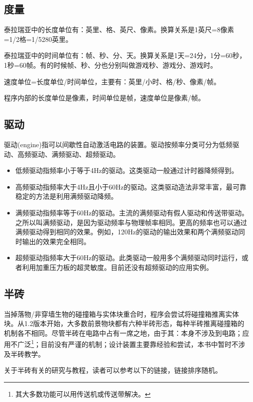 \subsection{度量}
泰拉瑞亚中的长度单位有：英里、格、英尺、像素。换算关系是1英尺=8像素=1/2格=1/5280英里。

泰拉瑞亚中的时间单位有：帧、秒、分、天。换算关系是1天=24分，1分=60秒，1秒=60帧。有的时候帧、秒、分也分别叫做游戏秒、游戏分、游戏时。

速度单位=长度单位/时间单位，主要有：英里/小时、格/秒、像素/帧。

程序内部的长度单位是像素，时间单位是帧，速度单位是像素/帧。

\subsection{驱动}

驱动(engine)指可以间歇性自动激活电路的装置。驱动按频率分类可分为低频驱动、高频驱动、满频驱动、超频驱动。

\begin{itemize}
\item 低频驱动指频率小于等于4Hz的驱动。这类驱动一般通过计时器降频得到。
\item 高频驱动指频率大于4Hz且小于60Hz的驱动。这类驱动造法非常丰富，最可靠稳定的方法是利用满频驱动降频。
\item 满频驱动指频率等于60Hz的驱动。主流的满频驱动有假人驱动和传送带驱动。之所以叫满频驱动，是因为驱动频率与物理帧率相同。更高的频率也可以通过满频驱动得到相同的效果。例如，120Hz的驱动的输出效果和两个满频驱动同时输出的效果完全相同。
\item 超频驱动指频率大于60Hz的驱动。此类驱动一般用多个满频驱动同时运行，或者利用加重压力板的超灵敏度。目前还没有超频驱动的应用实例。
\end{itemize}

\subsection{半砖}

当掉落物/非穿墙生物的碰撞箱与实体块重合时，程序会尝试将碰撞箱推离实体块。从1.2版本开始，大多数前景物块都有六种半砖形态，每种半砖推离碰撞箱的机制各不相同。尽管半砖在电路中占有一席之地，由于其：本身不涉及到电路；应用不广泛\footnote{其大多数功能可以用传送机或传送带解决。}；目前没有严谨的机制；设计装置主要靠经验和尝试，本书中暂时不涉及半砖教学。

关于半砖有关的研究与教程，读者可以参考以下的链接，链接排序随机。

